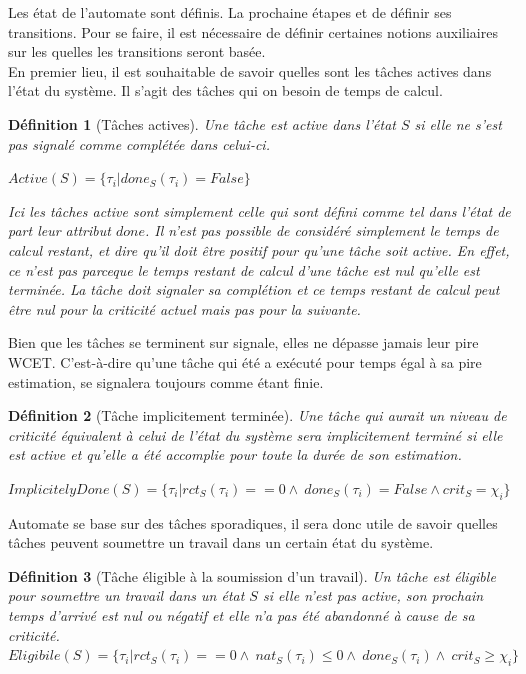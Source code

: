 \documentclass[12pt,a4paper,oneside]{book}
\theoremstyle{break}
\newtheorem{defin}{Définition}[chapter]
\theoremstyle{breakplain}
\begin{document}
Les état de l'automate sont définis. La prochaine étapes et de définir ses transitions. Pour se faire, il est nécessaire de définir certaines notions auxiliaires sur les quelles les transitions seront basée.\\

En premier lieu, il est souhaitable de savoir quelles sont les tâches actives dans l'état du système. Il s'agit des tâches qui on besoin de temps de calcul.

\begin{defin}[Tâches actives]
\label{spo:act}
Une tâche est active dans l'état $S$ si elle ne s'est pas signalé comme complétée dans celui-ci.

$Active(S) = \{\tau_i | done_S(\tau_i) = False \}$

Ici les tâches active sont simplement celle qui sont défini comme tel dans l'état de part leur attribut $done$. Il n'est pas possible de considéré simplement le temps de calcul restant, et dire qu'il doit être positif pour qu'une tâche soit active. En effet, ce n'est pas parceque le temps restant de calcul d'une tâche est nul qu'elle est terminée. La tâche doit signaler sa complétion et ce temps restant de calcul peut être nul pour la criticité actuel mais pas pour la suivante.
\end{defin}

Bien que les tâches se terminent sur signale, elles ne dépasse jamais leur pire WCET. C'est-à-dire qu'une tâche qui été a exécuté pour temps égal à sa pire estimation, se signalera toujours comme étant finie.


\begin{defin}[Tâche implicitement terminée]
\label{spo:impdone}
Une tâche qui aurait un niveau de criticité équivalent à celui de l’état du système sera
implicitement terminé si elle est active et qu’elle a été accomplie pour toute la
durée de son estimation.

$ImplicitelyDone(S) = \{\tau_i | rct_S(\tau_i) == 0 \wedge\ done_S(\tau_i) = False \wedge crit_S=\chi_i\}$\\
\end{defin}

Automate se base sur des tâches sporadiques, il sera donc utile de savoir quelles tâches peuvent soumettre un travail dans un certain état du système.

\begin{defin}[Tâche éligible à la soumission d'un travail]
\label{spo:eligible}
Un tâche est éligible pour soumettre un travail dans un état $S$ si elle n'est pas active, son prochain temps d'arrivé est nul ou négatif et elle n'a pas été abandonné à cause de sa criticité.
$Eligibile(S) = \{\tau_i | rct_S(\tau_i) == 0 \wedge\ nat_S(\tau_i) \leq 0 \wedge\ done_S(\tau_i)\wedge\ crit_S\geq\chi_i\}$\\
\end{defin}
\end{document}
